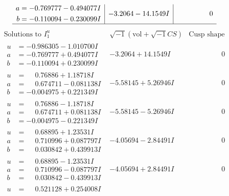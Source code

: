 \documentclass[1p]{elsarticle_modified}
\theoremstyle{definition}
\newcommand{\I}{\sqrt{-1}}
\begin{document}
$$\begin{array}{c|c|c}
\begin{aligned}
a &= -0.769777 - 0.494077 I \\
b &= -0.110094 - 0.230099 I\end{aligned}
 & -3.2064 - 14.1549 I & \phantom{-0.000000 } 0\\
 \hline 
 \end{array}$$\newpage$$\begin{array}{c|c|c}  
\text{Solutions to }I^u_{1}& \I (\text{vol} + \sqrt{-1}CS) & \text{Cusp shape}\\
 \hline 
\begin{aligned}
u &= -0.986305 - 1.010700 I \\
a &= -0.769777 + 0.494077 I \\
b &= -0.110094 + 0.230099 I\end{aligned}
 & -3.2064 + 14.1549 I & \phantom{-0.000000 } 0 \\ \hline\begin{aligned}
u &= \phantom{-}0.76886 + 1.18718 I \\
a &= \phantom{-}0.674711 - 0.081138 I \\
b &= -0.004975 + 0.221349 I\end{aligned}
 & -5.58145 + 5.26946 I & \phantom{-0.000000 } 0 \\ \hline\begin{aligned}
u &= \phantom{-}0.76886 - 1.18718 I \\
a &= \phantom{-}0.674711 + 0.081138 I \\
b &= -0.004975 - 0.221349 I\end{aligned}
 & -5.58145 - 5.26946 I & \phantom{-0.000000 } 0 \\ \hline\begin{aligned}
u &= \phantom{-}0.68895 + 1.23531 I \\
a &= \phantom{-}0.710996 + 0.087797 I \\
b &= \phantom{-}0.030842 + 0.439913 I\end{aligned}
 & -4.05694 - 2.84491 I & \phantom{-0.000000 } 0 \\ \hline\begin{aligned}
u &= \phantom{-}0.68895 - 1.23531 I \\
a &= \phantom{-}0.710996 - 0.087797 I \\
b &= \phantom{-}0.030842 - 0.439913 I\end{aligned}
 & -4.05694 + 2.84491 I & \phantom{-0.000000 } 0 \\ \hline\begin{aligned}
u &= \phantom{-}0.521128 + 0.254008 I \\

\end{aligned}
\end{array}$$
\end{document}
